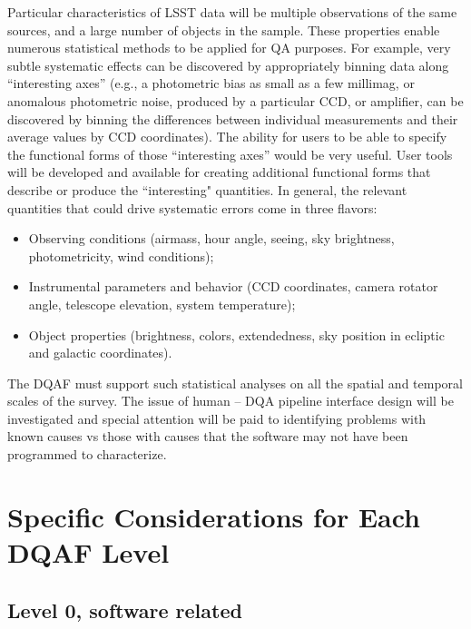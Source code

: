 \documentclass[SE,toc]{lsstdoc}
\begin{document}
Particular characteristics of LSST data will be multiple observations of the same sources, and a large
number of objects in the sample. These properties enable numerous statistical methods to be applied
for QA purposes. For example, very subtle systematic effects can be discovered by appropriately binning
data along ``interesting axes''  (e.g., a photometric bias as small as a few millimag, or anomalous
photometric noise, produced by a particular CCD, or amplifier, can be discovered by binning the differences
between individual measurements and their average values by CCD coordinates).  The ability for users to be able to specify the functional forms of those ``interesting axes'' would be very useful.   User tools will be developed and available for creating additional functional forms that describe or produce the ``interesting" quantities.  In general, the relevant
quantities that could drive systematic errors come in three flavors:
\begin{itemize}
\item Observing conditions (airmass, hour angle, seeing, sky brightness, photometricity, wind conditions);
\item Instrumental parameters and behavior (CCD coordinates, camera rotator angle, telescope elevation, system
         temperature);
\item Object properties (brightness, colors, extendedness, sky position in ecliptic and galactic coordinates).
\end{itemize}


The DQAF must support such statistical analyses on all the spatial and temporal scales of the survey. The issue of human – DQA pipeline interface design will be investigated and special attention will be paid to identifying problems with known causes vs those with causes that the software may not have been programmed to characterize.




\section{Specific Considerations for Each DQAF Level}


\subsection{Level 0, software related}
\end{document}
